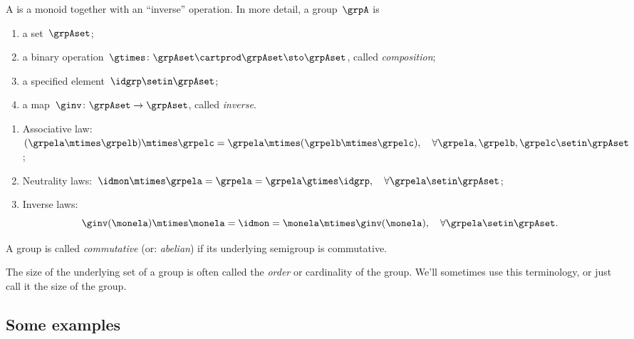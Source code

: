 \begin{ctdefinition}[Group]
    \label{def:group}
    A \emph{} is a monoid together with an ``inverse'' operation.
    In more detail, a group~$\grpA$ is
    \begin{body}
        \constit
        \begin{enumerate}
            \item a set~$\grpAset$;
            \item a binary operation~$\gtimes \colon \grpAset \cartprod \grpAset \sto \grpAset$, called \emph{composition};
            \item a specified element~$\idgrp \setin \grpAset$;
            \item a map~$\ginv\colon \grpAset \to \grpAset$, called \emph{inverse}.
        \end{enumerate}
        \condit
        \begin{enumerate}
            \item Associative law:~$(\grpela\mtimes \grpelb)\mtimes \grpelc=\grpela\mtimes (\grpelb\mtimes \grpelc), \quad \forall  \grpela, \grpelb, \grpelc \setin \grpAset$;
            \item Neutrality laws:~$\idmon\mtimes \grpela=\grpela=\grpela \gtimes \idgrp, \quad \forall  \grpela \setin \grpAset$;
            \item Inverse laws:
                  \begin{equation}
                      \label{eq:group-inverse-law}
                      \ginv(\monela) \mtimes \monela = \idmon = \monela \mtimes \ginv(\monela), \quad \forall  \grpela  \setin \grpAset.
                  \end{equation}
        \end{enumerate}
    \end{body}
\end{ctdefinition}

\begin{remark}
A group is called \emph{commutative} (or: \emph{abelian}) if its underlying semigroup is commutative.
\end{remark}

\begin{remark}
The size of the underlying set of a group is often called the \emph{order} or cardinality of the group. We'll sometimes use this terminology, or just call it the size of the group.  
\end{remark}

\subsection{Some examples}

